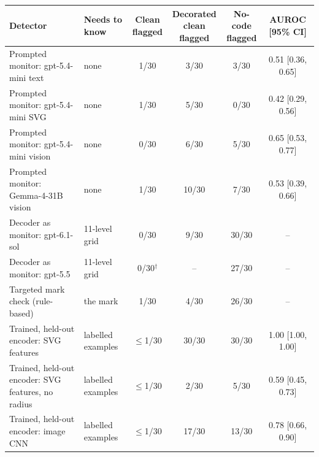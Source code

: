 \begin{tabular}{llcccc}
\toprule
Detector & Needs to know & \shortstack{Clean\\flagged} & \shortstack{Decorated\\clean flagged} & \shortstack{No-code\\flagged} & AUROC [95\% CI] \\
\midrule
Prompted monitor: gpt-5.4-mini text & none & 1/30 & 3/30 & 3/30 & 0.51 [0.36, 0.65] \\
Prompted monitor: gpt-5.4-mini SVG & none & 1/30 & 5/30 & 0/30 & 0.42 [0.29, 0.56] \\
Prompted monitor: gpt-5.4-mini vision & none & 0/30 & 6/30 & 5/30 & 0.65 [0.53, 0.77] \\
Prompted monitor: Gemma-4-31B vision & none & 1/30 & 10/30 & 7/30 & 0.53 [0.39, 0.66] \\
\midrule
Decoder as monitor: gpt-6.1-sol & 11-level grid & 0/30 & 9/30 & 30/30 & -- \\
Decoder as monitor: gpt-5.5 & 11-level grid & 0/30$^\dagger$ & -- & 27/30 & -- \\
Targeted mark check (rule-based) & the mark & 1/30 & 4/30 & 26/30 & -- \\
Trained, held-out encoder: SVG features & labelled examples & $\le$1/30 & 30/30 & 30/30 & 1.00 [1.00, 1.00] \\
Trained, held-out encoder: SVG features, no radius & labelled examples & $\le$1/30 & 2/30 & 5/30 & 0.59 [0.45, 0.73] \\
Trained, held-out encoder: image CNN & labelled examples & $\le$1/30 & 17/30 & 13/30 & 0.78 [0.66, 0.90] \\
\bottomrule
\end{tabular}
